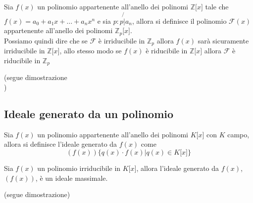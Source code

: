 \begin{flushleft}
\begin{proprieta}
Sia $f(x)$ un polinomio appartenente all'anello dei polinomi $\mathbb{Z}\big[x\big]$ tale che $f(x) = a_0 + a_1 x +\hdots+a_n x^n$ e sia $p:p\not{|}a_n$, allora si definisce il polinomio $\mathcal{F}(x)$ appartenente all'anello dei polinomi $\mathbb{Z}_p\big[x\big]$.\\
Possiamo quindi dire che se $\mathcal{F}$ è irriducibile in $\mathbb{Z}_p$ allora $f(x)$ sarà sicuramente irriducibile in $\mathbb{Z}\big[x\big]$, allo stesso modo se $f(x)$ è riducibile in $\mathbb{Z}\big[x\big]$ allora $\mathcal{F}$ è riducibile in $\mathbb{Z}_p$
\end{proprieta}
(segue dimostrazione \\ \vspace{300px})


\subsection{Ideale generato da un polinomio}
Sia $f(x)$ un polinomio appartenente all'anello dei polinomi $K\big[x\big]$ con $K$ campo, allora si definisce l'ideale generato da $f(x)$ come 
\[(f(x)) \{q(x)\cdot f(x)|q(x)\in K\big[x\big]\}\]

\begin{proprieta}
Sia $f(x)$ un polinomio irriducibile in $K\big[x\big]$, allora l'ideale generato da $f(x)$, $(f(x))$, è un ideale massimale.
\end{proprieta}
(segue dimostrazione)
\\ \vspace{300px}



\end{flushleft}

